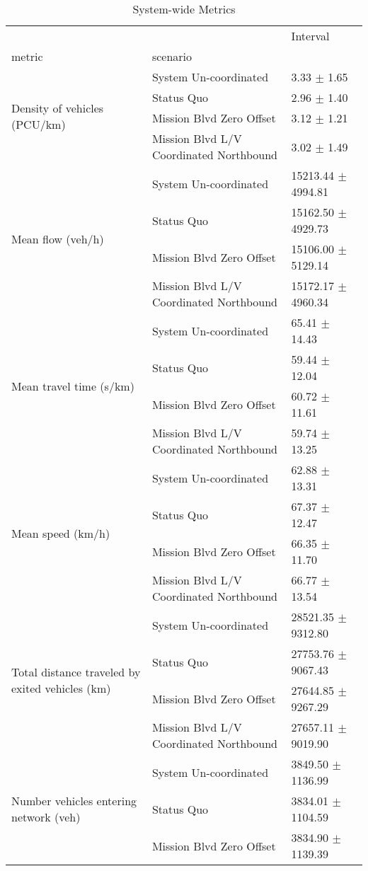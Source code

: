 \begin{table}
\caption{System-wide Metrics}
\begin{tabular}{lll}
\toprule
 &  & Interval \\
metric & scenario &  \\
\midrule
\multirow[t]{4}{*}{Density of vehicles (PCU/km)} & System Un-coordinated & 3.33 $\pm$ 1.65 \\
 & Status Quo & 2.96 $\pm$ 1.40 \\
 & Mission Blvd Zero Offset & 3.12 $\pm$ 1.21 \\
 & Mission Blvd L/V Coordinated Northbound & 3.02 $\pm$ 1.49 \\
\multirow[t]{4}{*}{Mean flow (veh/h)} & System Un-coordinated & 15213.44 $\pm$ 4994.81 \\
 & Status Quo & 15162.50 $\pm$ 4929.73 \\
 & Mission Blvd Zero Offset & 15106.00 $\pm$ 5129.14 \\
 & Mission Blvd L/V Coordinated Northbound & 15172.17 $\pm$ 4960.34 \\
\multirow[t]{4}{*}{Mean travel time (s/km)} & System Un-coordinated & 65.41 $\pm$ 14.43 \\
 & Status Quo & 59.44 $\pm$ 12.04 \\
 & Mission Blvd Zero Offset & 60.72 $\pm$ 11.61 \\
 & Mission Blvd L/V Coordinated Northbound & 59.74 $\pm$ 13.25 \\
\multirow[t]{4}{*}{Mean speed (km/h)} & System Un-coordinated & 62.88 $\pm$ 13.31 \\
 & Status Quo & 67.37 $\pm$ 12.47 \\
 & Mission Blvd Zero Offset & 66.35 $\pm$ 11.70 \\
 & Mission Blvd L/V Coordinated Northbound & 66.77 $\pm$ 13.54 \\
\multirow[t]{4}{*}{Total distance traveled by exited vehicles (km)} & System Un-coordinated & 28521.35 $\pm$ 9312.80 \\
 & Status Quo & 27753.76 $\pm$ 9067.43 \\
 & Mission Blvd Zero Offset & 27644.85 $\pm$ 9267.29 \\
 & Mission Blvd L/V Coordinated Northbound & 27657.11 $\pm$ 9019.90 \\
\multirow[t]{4}{*}{Number vehicles entering network (veh)} & System Un-coordinated & 3849.50 $\pm$ 1136.99 \\
 & Status Quo & 3834.01 $\pm$ 1104.59 \\
 & Mission Blvd Zero Offset & 3834.90 $\pm$ 1139.39 \\

\end{tabular}
\end{table}
